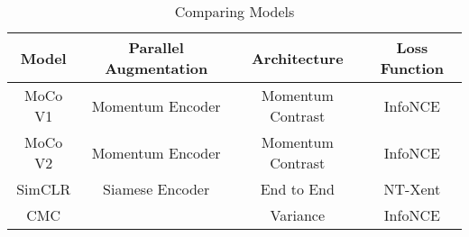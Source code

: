 \begin{table}[ht]
    \centering
    \caption{Comparing Models}
    \begin{tabular}{|c|c|c|c|}
        \hline
        Model & Parallel Augmentation & Architecture & Loss Function \\
        \hline
        MoCo V1  & Momentum Encoder & Momentum Contrast & InfoNCE \\
        \hline
        MoCo V2 & Momentum Encoder& Momentum Contrast& InfoNCE\\
        \hline
        SimCLR & Siamese Encoder & End to End & NT-Xent\\
        \hline
        CMC &  & Variance & InfoNCE\\
        \hline
    \end{tabular}
    \label{tab:example}
\end{table}

